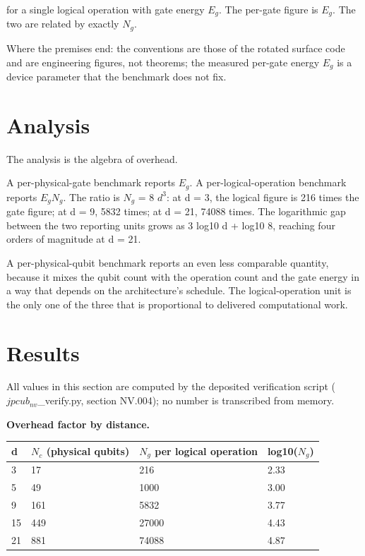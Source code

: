 \documentclass[11pt]{article}
\begin{document}
for a single logical operation with gate energy $E_{g}$. The per-gate figure is $E_{g}$. The two are related by exactly $N_{g}$.

Where the premises end: the conventions are those of the rotated surface code and are engineering figures, not theorems; the measured per-gate energy $E_{g}$ is a device parameter that the benchmark does not fix.

\section{Analysis}
The analysis is the algebra of overhead.

A per-physical-gate benchmark reports $E_{g}$. A per-logical-operation benchmark reports $E_{g}   N_{g}$. The ratio is $N_{g}$ = 8 $d^{3}$: at d = 3, the logical figure is 216 times the gate figure; at d = 9, 5832 times; at d = 21, 74088 times. The logarithmic gap between the two reporting units grows as 3 log10 d + log10 8, reaching four orders of magnitude at d = 21.

A per-physical-qubit benchmark reports an even less comparable quantity, because it mixes the qubit count with the operation count and the gate energy in a way that depends on the architecture's schedule. The logical-operation unit is the only one of the three that is proportional to delivered computational work.

\section{Results}
All values in this section are computed by the deposited verification script ($jpcub_{nv}$\_verify.py, section NV.004); no number is transcribed from memory.

\textbf{Overhead factor by distance.}

\begin{table}[h]
\centering
\begin{tabular}{llll}
\toprule
d & $N_{c}$ (physical qubits) & $N_{g}$ per logical operation & log10($N_{g}$) \\
\midrule
3 & 17 & 216 & 2.33 \\
5 & 49 & 1000 & 3.00 \\
9 & 161 & 5832 & 3.77 \\
15 & 449 & 27000 & 4.43 \\
21 & 881 & 74088 & 4.87 \\
\bottomrule
\end{tabular}
\end{table}
\end{document}
